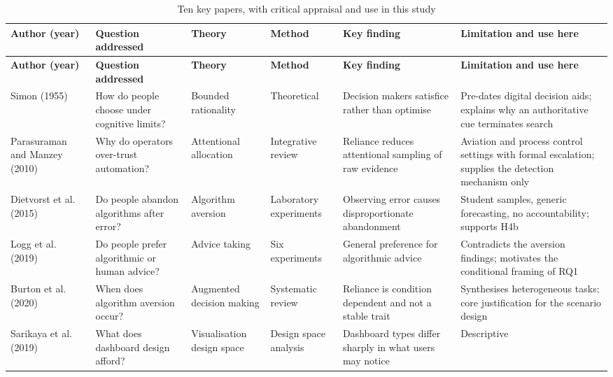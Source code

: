 \documentclass[12pt,a4paper]{article}
\begin{document}
\begin{longtable}{@{}p{2.4cm} p{2.5cm} p{2.0cm} p{2.1cm} p{2.5cm} p{2.6cm}@{}}
\caption{Ten key papers, with critical appraisal and use in this study}\\
\toprule
\footnotesize\textbf{Author (year)} & \footnotesize\textbf{Question addressed} &
\footnotesize\textbf{Theory} & \footnotesize\textbf{Method} & \footnotesize\textbf{Key finding} &
\footnotesize\textbf{Limitation and use here} \\
\midrule
\endfirsthead
\toprule
\footnotesize\textbf{Author (year)} & \footnotesize\textbf{Question addressed} &
\footnotesize\textbf{Theory} & \footnotesize\textbf{Method} & \footnotesize\textbf{Key finding} &
\footnotesize\textbf{Limitation and use here} \\
\midrule
\endhead
\bottomrule
\endfoot
\footnotesize Simon (1955) & How do people choose under cognitive limits? & Bounded rationality &
Theoretical & Decision makers satisfice rather than optimise & Pre-dates digital decision aids; explains
why an authoritative cue terminates search \\
\addlinespace
\footnotesize Parasuraman and Manzey (2010) & Why do operators over-trust automation? & Attentional
allocation & Integrative review & Reliance reduces attentional sampling of raw evidence & Aviation and
process control settings with formal escalation; supplies the detection mechanism only \\
\addlinespace
\footnotesize Dietvorst et al. (2015) & Do people abandon algorithms after error? & Algorithm
aversion & Laboratory experiments & Observing error causes disproportionate abandonment & Student samples,
generic forecasting, no accountability; supports H4b \\
\addlinespace
\footnotesize Logg et al. (2019) & Do people prefer algorithmic or human advice? & Advice taking &
Six experiments & General preference for algorithmic advice & Contradicts the aversion findings; motivates
the conditional framing of RQ1 \\
\addlinespace
\footnotesize Burton et al. (2020) & When does algorithm aversion occur? & Augmented decision making
& Systematic review & Reliance is condition dependent and not a stable trait & Synthesises heterogeneous
tasks; core justification for the scenario design \\
\addlinespace
\footnotesize Sarikaya et al. (2019) & What does dashboard design afford? & Visualisation design
space & Design space analysis & Dashboard types differ sharply in what users may notice & Descriptive

\end{longtable}
\end{document}
